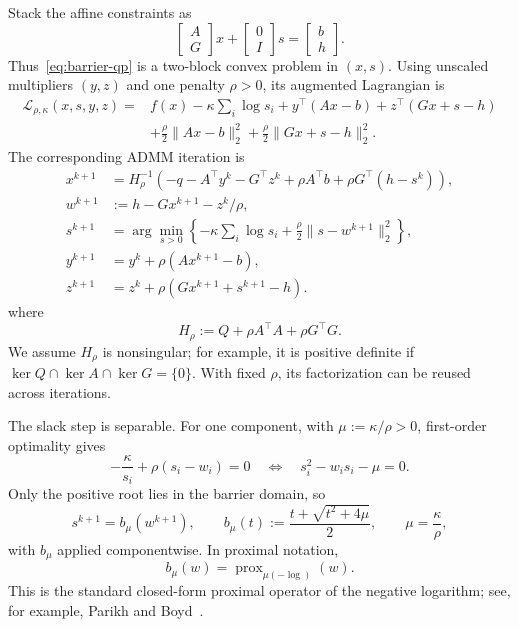 \documentclass[9pt]{extarticle}
\newcommand{\prox}{\operatorname{prox}}
\begin{document}
Stack the affine constraints as
\[
 \begin{bmatrix}A\\G\end{bmatrix}x+
 \begin{bmatrix}0\\I\end{bmatrix}s=
 \begin{bmatrix}b\\h\end{bmatrix}.
\]
Thus~\eqref{eq:barrier-qp} is a two-block convex problem in $(x,s)$.  Using
unscaled multipliers $(y,z)$ and one penalty $\rho>0$, its augmented Lagrangian is
\begin{align}
 \mathcal{L}_{\rho,\kappa}(x,s,y,z)
 ={}& f(x)-\kappa\sum_i\log s_i
   +y^\top(Ax-b)+z^\top(Gx+s-h) \nonumber\\
 &+\frac{\rho}{2}\lVert Ax-b\rVert_2^2
  +\frac{\rho}{2}\lVert Gx+s-h\rVert_2^2.          \label{eq:augLag}
\end{align}
The corresponding ADMM iteration is
\begin{align}
 x^{k+1}&=H_\rho^{-1}\!\left(
   -q-A^\top y^k-G^\top z^k
   +\rho A^\top b+\rho G^\top(h-s^k)\right),       \label{eq:xstep}\\
 w^{k+1}&:=h-Gx^{k+1}-z^k/\rho,                    \label{eq:wdef}\\
 s^{k+1}&=\arg\min_{s>0}\left\{
   -\kappa\sum_i\log s_i
   +\frac{\rho}{2}\lVert s-w^{k+1}\rVert_2^2\right\}, \label{eq:sprox}\\
 y^{k+1}&=y^k+\rho(Ax^{k+1}-b),                    \label{eq:yupdate}\\
 z^{k+1}&=z^k+\rho(Gx^{k+1}+s^{k+1}-h).            \label{eq:zupdate}
\end{align}
where
\begin{equation}
 H_\rho:=Q+\rho A^\top A+\rho G^\top G.
\end{equation}
We assume $H_\rho$ is nonsingular; for example, it is positive definite if
$\ker Q\cap\ker A\cap\ker G=\{0\}$.  With fixed $\rho$, its factorization can be
reused across iterations.

The slack step is separable.  For one component, with
$\mu:=\kappa/\rho>0$, first-order optimality gives
\begin{equation}
 -\frac{\kappa}{s_i}+\rho(s_i-w_i)=0
 \quad\Longleftrightarrow\quad
 s_i^2-w_i s_i-\mu=0.
\end{equation}
Only the positive root lies in the barrier domain, so
\begin{equation}
 \boxed{
 s^{k+1}=b_\mu(w^{k+1}),\qquad
 b_\mu(t):=\frac{t+\sqrt{t^2+4\mu}}{2},\qquad
 \mu=\frac{\kappa}{\rho},}
 \label{eq:prox}
\end{equation}
with $b_\mu$ applied componentwise.  In proximal notation,
\begin{equation}
 b_\mu(w)=\prox_{\mu(-\log)}(w).
\end{equation}
This is the standard closed-form proximal operator of the negative logarithm;
see, for example, Parikh and Boyd~\cite{parikh2014}.
\end{document}
